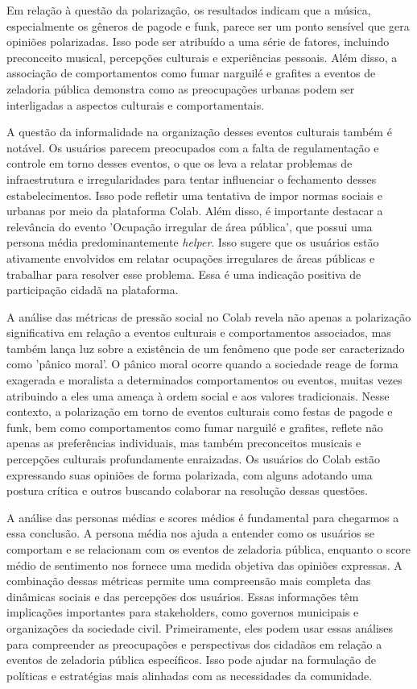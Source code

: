 Em relação à questão da polarização, os resultados indicam que a música, especialmente os gêneros de pagode e funk, parece ser um ponto sensível que gera opiniões polarizadas. Isso pode ser atribuído a uma série de fatores, incluindo preconceito musical, percepções culturais e experiências pessoais. Além disso, a associação de comportamentos como fumar narguilé e grafites a eventos de zeladoria pública demonstra como as preocupações urbanas podem ser interligadas a aspectos culturais e comportamentais.

A questão da informalidade na organização desses eventos culturais também é notável. Os usuários parecem preocupados com a falta de regulamentação e controle em torno desses eventos, o que os leva a relatar problemas de infraestrutura e irregularidades para tentar influenciar o fechamento desses estabelecimentos. Isso pode refletir uma tentativa de impor normas sociais e urbanas por meio da plataforma Colab. Além disso, é importante destacar a relevância do evento 'Ocupação irregular de área pública', que possui uma persona média predominantemente \textit{helper}. Isso sugere que os usuários estão ativamente envolvidos em relatar ocupações irregulares de áreas públicas e trabalhar para resolver esse problema. Essa é uma indicação positiva de participação cidadã na plataforma.

A análise das métricas de pressão social no Colab revela não apenas a polarização significativa em relação a eventos culturais e comportamentos associados, mas também lança luz sobre a existência de um fenômeno que pode ser caracterizado como 'pânico moral'. O pânico moral ocorre quando a sociedade reage de forma exagerada e moralista a determinados comportamentos ou eventos, muitas vezes atribuindo a eles uma ameaça à ordem social e aos valores tradicionais. Nesse contexto, a polarização em torno de eventos culturais como festas de pagode e funk, bem como comportamentos como fumar narguilé e grafites, reflete não apenas as preferências individuais, mas também preconceitos musicais e percepções culturais profundamente enraizadas. Os usuários do Colab estão expressando suas opiniões de forma polarizada, com alguns adotando uma postura crítica e outros buscando colaborar na resolução dessas questões.

A análise das personas médias e scores médios é fundamental para chegarmos a essa conclusão. A persona média nos ajuda a entender como os usuários se comportam e se relacionam com os eventos de zeladoria pública, enquanto o score médio de sentimento nos fornece uma medida objetiva das opiniões expressas. A combinação dessas métricas permite uma compreensão mais completa das dinâmicas sociais e das percepções dos usuários. Essas informações têm implicações importantes para stakeholders, como governos municipais e organizações da sociedade civil. Primeiramente, eles podem usar essas análises para compreender as preocupações e perspectivas dos cidadãos em relação a eventos de zeladoria pública específicos. Isso pode ajudar na formulação de políticas e estratégias mais alinhadas com as necessidades da comunidade.

